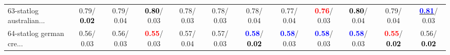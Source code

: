 \begin{table}[h]
\begin{center}
{\begin{tabular}{lc|c|c|c|c|c|c|c|c|c|c}
63-statlog australian... &   0.79/\textcolor{black}{\textbf{  0.02}} &   0.79/  0.04 & \textcolor{black}{\textbf{  0.80}}/  0.03 &   0.78/  0.03 &   0.78/  0.03 &   0.78/  0.04 &   0.77/  0.04 & \textcolor{red}{\textbf{  0.76}}/  0.03 & \textcolor{black}{\textbf{  0.80}}/  0.04 &   0.79/  0.04 & \underline{\textcolor{blue}{\textbf{  0.81}}}/  0.03 \\
64-statlog german cre... &   0.56/  0.03 &   0.56/  0.03 & \textcolor{red}{\textbf{  0.55}}/  0.03 &   0.57/  0.04 &   0.57/  0.03 & \textcolor{blue}{\textbf{  0.58}}/\textcolor{black}{\textbf{  0.02}} & \textcolor{blue}{\textbf{  0.58}}/  0.03 & \textcolor{blue}{\textbf{  0.58}}/  0.03 & \textcolor{blue}{\textbf{  0.58}}/  0.03 & \textcolor{red}{\textbf{  0.55}}/\textcolor{black}{\textbf{  0.02}} &   0.56/\textcolor{black}{\textbf{  0.02}} \\\end{tabular}
}\label{strats1b5NN}
\end{center}
\end{table}
